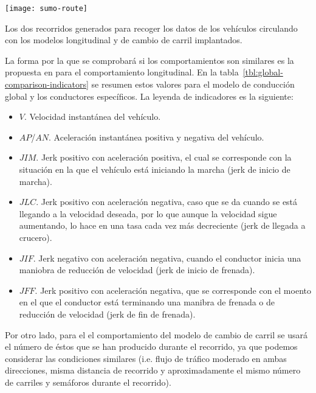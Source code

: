 \begin{marginfigure}
	\centering
	\texttt{[image: sumo-route]}
	\caption[Dos recorridos de prueba en el entorno virtual]{Los dos recorridos generados para recoger los datos de los vehículos circulando con los modelos longitudinal y de cambio de carril implantados.}
	\label{fig:sumo-route}
\end{marginfigure}

La forma por la que se comprobará si los comportamientos son similares es la propuesta en \cite{DiazAlvarez2014} para el comportamiento longitudinal. En la tabla~\ref{tbl:global-comparison-indicators} se resumen estos valores para el modelo de conducción global y los conductores específicos. La leyenda de indicadores es la siguiente:

\begin{itemize}
	\item $V$. Velocidad instantánea del vehículo.
	\item $AP$/$AN$. Aceleración instantánea positiva y negativa del vehículo.
	\item $JIM$. Jerk positivo con aceleración positiva, el cual se corresponde con la situación en la que el vehículo está iniciando la marcha (jerk de inicio de marcha).
	\item $JLC$. Jerk positivo con aceleración negativa, caso que se da cuando se está llegando a la velocidad deseada, por lo que aunque la velocidad sigue aumentando, lo hace en una tasa cada vez más decreciente (jerk de llegada a crucero).
	\item $JIF$. Jerk negativo con aceleración negativa, cuando el conductor inicia una maniobra de reducción de velocidad (jerk de inicio de frenada).
	\item $JFF$. Jerk positivo con aceleración negativa, que se corresponde con el moento en el que el conductor está terminando una manibra de frenada o de reducción de velocidad (jerk de fin de frenada).
\end{itemize}

Por otro lado, para el el comportamiento del modelo de cambio de carril se usará el número de éstos que se han producido durante el recorrido, ya que podemos considerar las condiciones similares (i.e. flujo de tráfico moderado en ambas direcciones, misma distancia de recorrido y aproximadamente el mismo número de carriles y semáforos durante el recorrido).


